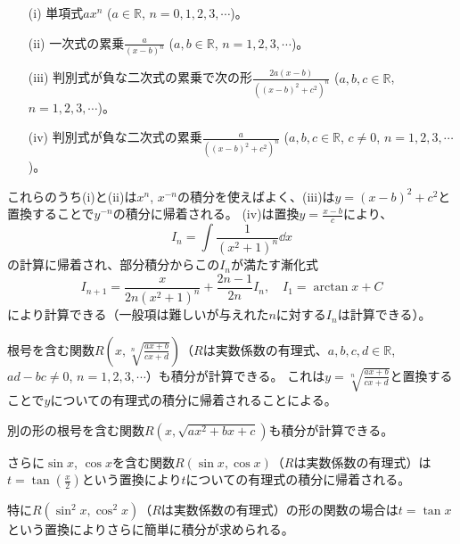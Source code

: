 \begin{itemize}
\item[(i)]
単項式$a x^n$ ($a \in \mathbb{R}$, $n = 0, 1, 2, 3, \cdots$)。
\item[(ii)]
一次式の累乗$\frac{a}{(x-b)^n}$ ($a, b \in \mathbb{R}$, $n = 1, 2, 3, \cdots$)。
\item[(iii)]
判別式が負な二次式の累乗で次の形$\frac{2 a(x-b)}{((x-b)^2+c^2)^n}$ ($a, b, c \in \mathbb{R}$, $n = 1, 2, 3, \cdots$)。
\item[(iv)]
判別式が負な二次式の累乗$\frac{a}{((x-b)^2+c^2)^n}$ ($a, b, c \in \mathbb{R}$, $c \ne 0$, $n = 1, 2, 3, \cdots$)。
\end{itemize}

これらのうち(i)と(ii)は$x^n$, $x^{-n}$の積分を使えばよく、(iii)は$y = (x-b)^2+c^2$と置換することで$y^{-n}$の積分に帰着される。
(iv)は置換$y = \frac{x-b}{c}$により、
$$
I_n = \int \frac{1}{(x^2+1)^n}\dd{x}
$$
の計算に帰着され、部分積分からこの$I_n$が満たす漸化式
$$
I_{n+1} = \frac{x}{2 n(x^2+1)^n}+\frac{2 n-1}{2 n}I_n, \quad I_1 = \arctan x+C
$$
により計算できる（一般項は難しいが与えれた$n$に対する$I_n$は計算できる）。

\begin{example}
\end{example}

根号を含む関数$R(x, \sqrt[n]{\frac{a x+b}{c x+d}})$（$R$は実数係数の有理式、$a, b, c, d \in \mathbb{R}$, $a d-b c \ne 0$, $n = 1, 2, 3, \cdots$）も積分が計算できる。
これは$y = \sqrt[n]{\frac{a x+b}{c x+d}}$と置換することで$y$についての有理式の積分に帰着されることによる。

\begin{example}
\end{example}

別の形の根号を含む関数$R(x, \sqrt{a x^2+b x+c})$も積分が計算できる。

\begin{example}
\end{example}

さらに$\sin x$, $\cos x$を含む関数$R(\sin x, \cos x)$（$R$は実数係数の有理式）は$t = \tan(\frac{x}{2})$という置換により$t$についての有理式の積分に帰着される。

\begin{example}
\end{example}

特に$R(\sin^2 x, \cos^2 x)$（$R$は実数係数の有理式）の形の関数の場合は$t = \tan x$という置換によりさらに簡単に積分が求められる。

\begin{example}
\end{example}


